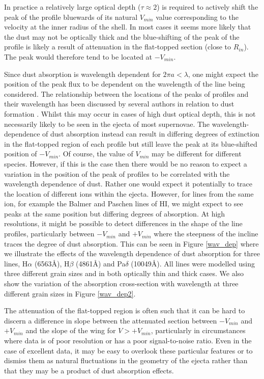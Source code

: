 In practice a relatively large optical depth ($\tau \approx 2$) is 
required to actively shift the peak of the profile bluewards of its natural 
$V_{min}$ value corresponding to the velocity at the inner radius of the shell.  In most cases it seems more likely that the dust
may not be optically thick and the blue-shifting of the peak of the profile is 
likely a result of attenuation in the flat-topped section (close to 
$R_{in}$).  The peak would therefore tend to be located at $-V_{min}$.

Since dust absorption is wavelength dependent for $2\pi a < \lambda$, one might expect the 
position of the peak flux to be dependent on the wavelength of the line being 
considered.  The relationship between the locations of the peaks 
of profiles and their wavelength has been discussed by several authors in 
relation to dust formation \citep{Smith2012, Fransson2013, Gall2014}.  Whilst this may occur in cases of high dust 
optical depth, this is not necessarily likely to be seen in the ejecta of 
most supernovae.  The wavelength-dependence of dust absorption instead 
can result in differing degrees of extinction in the flat-topped region of 
each profile but still leave the peak at its blue-shifted position of 
$-V_{min}$.  Of course, the value of $V_{min}$ may be different for 
different species.  However, if this is the case then there would be no 
reason to expect a variation in the position of the peak of profiles to be 
correlated with the wavelength dependence of dust.  Rather one would 
expect it potentially to trace the location of different ions within the ejecta. 
However, for lines from the same ion, for example the Balmer and Paschen lines of HI,
we might expect to see peaks at the same position but differing degrees of absorption.
At high resolutions, it might be possible to detect differences in the shape of the line 
profiles, particularly between $-V_{min}$ and $+V_{min}$ where the steepness of the 
incline traces the degree of dust absorption.  This can be seen in Figure \ref{wav_dep} 
where we illustrate the effects of the wavelength dependence of dust absorption for 
three lines, H$\alpha$ (6563\AA), H$\beta$ (4861\AA) and Pa$\delta$ (10049\AA).  
All lines were modelled using three different grain sizes and in both optically thin and 
thick cases.  We also show the variation of the absorption cross-section with 
wavelength at three different grain sizes in Figure \ref{wav_dep2}.

The attenuation of the flat-topped region is  often such that it can 
be hard to discern a difference in slope between the attenuated 
section between $-V_{min}$ and $+V_{min}$ and the slope of the wing for 
$V>+V_{min}$, particularly in circumstances where data is of poor 
resolution or has a poor signal-to-noise ratio.  Even in the case of 
excellent data, it may be easy to overlook these particular features or to 
dismiss them as natural fluctuations in the geometry of the ejecta rather than 
that they may be a product of dust absorption effects.

